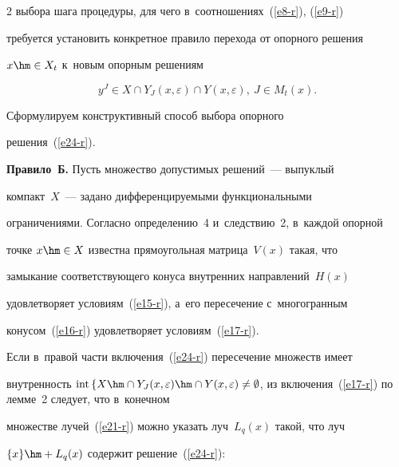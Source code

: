 \begin{multicols}{2}
выбора шага процедуры, для чего в~соотношениях~(\ref{e8-r}), (\ref{e9-r}) 


требуется установить конкретное правило перехода от опорного решения 


$x\hm\in X_t$ к~новым опорным решениям


  \begin{equation}


  y^J\in X\cap Y_J(x,\varepsilon) \cap Y(x,\varepsilon),\ J\in M_t(x).


  \label{e24-r}


  \end{equation}


  


  Сформулируем конструктивный способ выбора опорного 


решения~(\ref{e24-r}).


  


  \smallskip


  


  \noindent


  \textbf{Правило~Б.} Пусть множество допустимых решений~--- выпуклый 


компакт~$X$~--- задано дифференцируемыми функциональными 


ограничениями. Согласно определению~4 и~следствию~2, в~каждой опорной 


точке $x\hm\in X$ известна прямоугольная мат\-ри\-ца~$V(x)$ такая, что 


замыкание со\-от\-вет\-ст\-ву\-юще\-го конуса внутренних на\-прав\-ле\-ний~$H(x)$ 


удовлетворяет условиям~(\ref{e15-r}), а~его пересечение с~многогранным 


конусом~(\ref{e16-r}) удовле\-тво\-ря\-ет условиям~(\ref{e17-r}).


  


  Если в~правой части включения~(\ref{e24-r}) пересечение множеств имеет 


внутренность $\mathrm{int}\, \{ X\hm\cap Y_J(x,\varepsilon) \hm\cap Y(x,\varepsilon)\not= 


\emptyset$, из включения~(\ref{e17-r}) по лемме~2 следует, что в~конечном 


множестве лучей~(\ref{e21-r}) можно указать луч~$L_q(x)$ такой, что луч 


$\{x\}\hm+ L_q(x)$ содержит решение~(\ref{e24-r}):



\end{multicols}
